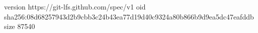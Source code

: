 version https://git-lfs.github.com/spec/v1
oid sha256:08d68257943d2b9cbb3c24b43ea77d19d40c9324a80b866b9d9ea5dc47eafddb
size 87540
